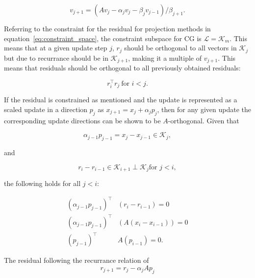 \begin{equation}
    v_{j+1} = \left(A v_j - \alpha_j v_j - \beta_j v_{j-1}\right)/\beta_{j+1}.
\end{equation}

Referring to the constraint for the residual for projection methods in equation~\ref{eq:constraint_space}, the constraint subspace for CG is $\mathcal{L} = \mathcal{K}_m$. This means that at a given update step $j$, $r_j$ should be orthogonal to all vectors in $\mathcal{K}_j$ but due to recurrance should be in $\mathcal{K}_{j+1}$, making it a multiple of $v_{j+1}$. This means that residuals should be orthogonal to all previously obtained residuals:

\begin{equation}
    r_i^\top r_j\ \text{for $i < j$}.
\end{equation}

If the residual is constrained as mentioned and the update is represented as a scaled update in a direction $p_j$ as $x_{j+1} = x_{j} + \alpha_j p_j$, then for any given update the corresponding update directions can be shown to be $A$-orthogonal. Given that 

\begin{equation}
	\alpha_{j-1}p_{j-1} = x_{j} - x_{j-1} \in \mathcal{K}_j,
\end{equation} 

and 

\begin{equation}
r_i - r_{i-1} \in \mathcal{K}_{i+1} \perp \mathcal{K}_j \text{for $j < i$}, 
\end{equation}

the following holds for all $j < i$:

\begin{equation}
    \label{eq:A_orth}
    \begin{aligned}
    \left(\alpha_{j-1}p_{j-1}\right)^\top& \left(r_i - r_{i-1}\right) = 0 \\
    \left(\alpha_{j-1}p_{j-1}\right)^\top &\left(A \left(x_i - x_{i-1}\right)\right) = 0 \\
    \left(p_{j-1}\right)^\top& A \left(p_{i-1}\right) = 0.
    \end{aligned}
\end{equation}

The residual following the recurrance relation of
\begin{equation}
    r_{j+1} = r_j - \alpha_j A p_j
\end{equation}

